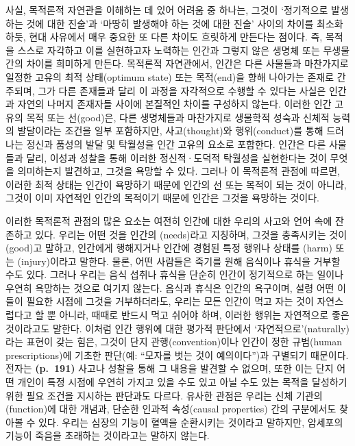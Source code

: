 사실, 목적론적 자연관을 이해하는 데 있어 어려움 중 하나는, 그것이
`정기적으로 발생하는 것에 대한 진술'과 `마땅히 발생해야 하는 것에 대한
진술' 사이의 차이를 최소화하듯, 현대 사유에서 매우 중요한 또 다른 차이도
흐릿하게 만든다는 점이다. 즉, 목적을 스스로 자각하고 이를 실현하고자
노력하는 인간과 그렇지 않은 생명체 또는 무생물 간의 차이를 희미하게
만든다. 목적론적 자연관에서, 인간은 다른 사물들과 마찬가지로 일정한
고유의 최적 상태(optimum state) 또는 목적(end)을 향해 나아가는 존재로
간주되며, 그가 다른 존재들과 달리 이 과정을 자각적으로 수행할 수 있다는
사실은 인간과 자연의 나머지 존재자들 사이에 본질적인 차이를 구성하지
않는다. 이러한 인간 고유의 목적 또는 선(good)은, 다른 생명체들과
마찬가지로 생물학적 성숙과 신체적 능력의 발달이라는 조건을 일부
포함하지만, 사고(thought)와 행위(conduct)를 통해 드러나는 정신과 품성의
발달 및 탁월성을 인간 고유의 요소로 포함한다. 인간은 다른 사물들과 달리,
이성과 성찰을 통해 이러한 정신적·도덕적 탁월성을 실현한다는 것이 무엇을
의미하는지 발견하고, 그것을 욕망할 수 있다. 그러나 이 목적론적 관점에
따르면, 이러한 최적 상태는 인간이 욕망하기 때문에 인간의 선 또는 목적이
되는 것이 아니라, 그것이 이미 자연적인 인간의 목적이기 때문에 인간은
그것을 욕망하는 것이다.

이러한 목적론적 관점의 많은 요소는 여전히 인간에 대한 우리의 사고와 언어
속에 잔존하고 있다. 우리는 어떤 것을 인간의 (needs)라고
지칭하며, 그것을 충족시키는 것이 (good)고 말하고, 인간에게
행해지거나 인간에  경험된 특정 행위나 상태를
(harm) 또는 (injury)이라고 말한다. 물론, 어떤
사람들은 죽기를 원해 음식이나 휴식을 거부할 수도 있다. 그러나 우리는
음식 섭취나 휴식을 단순히 인간이 정기적으로 하는 일이나 우연히 욕망하는
것으로 여기지 않는다. 음식과 휴식은 인간의 욕구이며, 설령 어떤 이들이
필요한 시점에 그것을 거부하더라도, 우리는 모든 인간이 먹고 자는 것이
자연스럽다고 할 뿐 아니라, 때때로 반드시 먹고 쉬어야 하며, 이러한 행위는
자연적으로 좋은 것이라고도 말한다. 이처럼 인간 행위에 대한 평가적
판단에서 `자연적으로'(naturally)라는 표현이 갖는 힘은, 그것이 단지
관행(convention)이나 인간이 정한 규범(human prescriptions)에 기초한
판단(예: ``모자를 벗는 것이 예의이다'')과 구별되기 때문이다. 전자는
\textbf{(p.~191)} 사고나 성찰을 통해 그 내용을 발견할 수 없으며, 또한
이는 단지 어떤 개인이 특정 시점에 우연히 가지고 있을 수도 있고 아닐 수도
있는 목적을 달성하기 위한 필요 조건을 지시하는 판단과도 다르다. 유사한
관점은 우리는 신체 기관의 (function)에 대한 개념과, 단순한
인과적 속성(causal properties) 간의 구분에서도 찾아볼 수 있다. 우리는
심장의 기능이 혈액을 순환시키는 것이라고 말하지만, 암세포의 기능이
죽음을 초래하는 것이라고는 말하지 않는다.

